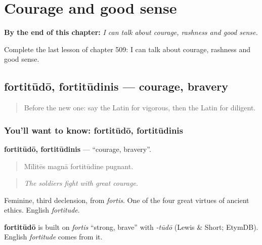 
\chapter{Courage and good sense}
\label{ch:la-courage-and-good-sense}

\begin{chapteropening}
\textbf{By the end of this chapter:} \emph{I can talk about courage, rashness and good sense.}

Complete the last lesson of chapter 509: I can talk about courage, rashness and good sense.
\end{chapteropening}

\section[fortitūdō, fortitūdinis]{fortitūdō, fortitūdinis — courage, bravery}

\label{lesson:LA-C509-fortitudo}



\begin{quote}
Before the new one: say the Latin for vigorous, then the Latin for diligent.
\end{quote}

\subsection*{You'll want to know: fortitūdō, fortitūdinis}
\textbf{fortitūdō, fortitūdinis} — \textquotedblleft{}courage, bravery\textquotedblright{}.

\begin{quote}
Mīlitēs magnā fortitūdine pugnant.
\end{quote}

\begin{quote}
\emph{The soldiers fight with great courage.}
\end{quote}

Feminine, third declension, from \emph{fortis}. One of the four great virtues of ancient ethics. English \emph{fortitude}.

\begin{cousinweb}
\textbf{fortitūdō} is built on \emph{fortis} \textquotedblleft{}strong, brave\textquotedblright{} with \emph{-tūdō} (Lewis \& Short; EtymDB). English \emph{fortitude} comes from it.
\end{cousinweb}

